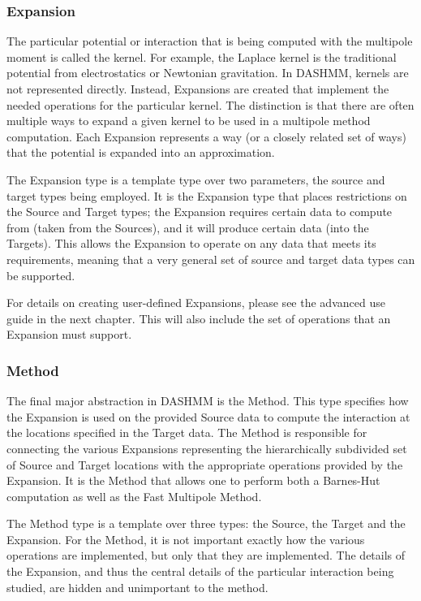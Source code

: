 \documentclass[11pt]{book}
\begin{document}
\subsubsection{Expansion} 

The particular potential or interaction that is being computed with
the multipole moment is called the kernel. For example, the Laplace
kernel is the traditional potential from electrostatics or Newtonian
gravitation. In DASHMM, kernels are not represented directly. Instead,
Expansions are created that implement the needed operations for the
particular kernel. The distinction is that there are often multiple
ways to expand a given kernel to be used in a multipole method
computation. Each Expansion represents a way (or a closely related set
of ways) that the potential is expanded into an approximation. 

The Expansion type is a template type over two parameters, the source
and target types being employed. It is the Expansion type that places
restrictions on the Source and Target types; the Expansion requires
certain data to compute from (taken from the Sources), and it will
produce certain data (into the Targets). This allows the Expansion to
operate on any data that meets its requirements, meaning that a very
general set of source and target data types can be supported. 

For details on creating user-defined Expansions, please see the
advanced use guide in the next chapter. This will also include the set
of operations that an Expansion must support. 

\subsubsection{Method} 
The final major abstraction in DASHMM is the Method. This type
specifies how the Expansion is used on the provided Source data to
compute the interaction at the locations specified in the Target
data. The Method is responsible for connecting the various Expansions
representing the hierarchically subdivided set of Source and Target
locations with the appropriate operations provided by the
Expansion. It is the Method that allows one to perform both a
Barnes-Hut computation as well as the Fast Multipole Method. 

The Method type is a template over three types: the Source, the Target
and the Expansion. For the Method, it is not important exactly how the
various operations are implemented, but only that they are
implemented. The details of the Expansion, and thus the central
details of the particular interaction being studied, are hidden and
unimportant to the method. 
\end{document}
